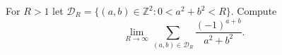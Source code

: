 For \(R>1\) let \(\mathcal{D}_R =\{ (a,b)\in \mathbb{Z}^2: 0<a^2+b^2<R\}\). Compute
\[\lim_{R\rightarrow \infty}{\sum_{(a,b)\in \mathcal{D}_R}{\frac{(-1)^{a+b}}{a^2+b^2}}}.\]

